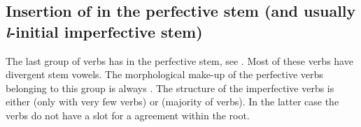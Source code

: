
\subsection{Insertion of  in the perfective stem (and usually \textit{l}-initial imperfective stem)}
\label{ssec:Insertion of l in the perfective stem}

The last group of verbs has  in the perfective stem, see . Most of these verbs have divergent stem vowels. The morphological make-up of the perfective verbs belonging to this group is always . The structure of the imperfective verbs is either  (only with very few verbs) or  (majority of verbs). In the latter case the verbs do not have a slot for a  agreement within the root.
%

